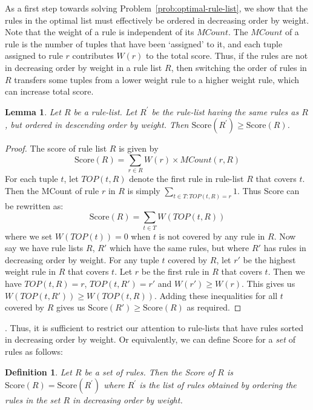 \documentclass[10pt,journal,compsoc]{IEEEtran}
\newtheorem{lemma}{Lemma}
\newtheorem{definition}{Definition}
\newcounter{prob}
\newcommand{\papertext}[1]{}
\newcommand{\techreporttext}[1]{#1}
\begin{document}
As a first step towards solving Problem~\ref{prob:optimal-rule-list}, we show that the rules in the optimal list must effectively be ordered in decreasing order by weight. Note that the weight of a rule is independent of its $MCount$. The $MCount$ of a rule is the number of tuples that have been `assigned' to it, and each tuple assigned to rule $r$ contributes $W(r)$ to the total score. Thus, if the rules are not in decreasing order by weight in a rule list $R$, then switching the order of rules in $R$ transfers some tuples from a lower weight rule to a higher weight rule, which can increase total score.

\begin{lemma}\label{lemma:rule-ordering}
Let $R$ be a rule-list. Let $R^{\prime}$ be the rule-list having the same rules as $R$, but ordered in descending order by weight. Then
$\text{Score}(R^{\prime}) \geq \text{Score}(R)$.
\end{lemma}
\papertext{The proof of this lemma, as well as other proofs, can be found in the technical report~\cite{tr}}\techreporttext{
\begin{proof}
The score of rule list $R$ is given by $$\text{Score}(R) = \sum_{r \in R} W(r) \times MCount(r,R)$$
For each tuple $t$, let $TOP(t,R)$ denote the first rule in rule-list $R$ that covers $t$. Then the MCount of rule $r$ in $R$ is simply $\sum_{t \in T : TOP(t,R) = r} 1$. Thus Score can be rewritten as:
$$\text{Score}(R) = \sum_{t \in T} W(TOP(t,R))$$
where we set $W(TOP(t)) = 0$ when $t$ is not covered by any rule in $R$. Now say we have rule lists $R$, $R'$ which have the same rules, but where $R'$ has rules in decreasing order by weight. For any tuple $t$ covered by $R$, let $r'$ be the highest weight rule in $R$ that covers $t$. Let $r$ be the first rule in $R$ that covers $t$. Then we have $TOP(t,R) = r$, $TOP(t, R') = r'$ and $W(r') \geq W(r)$. This gives us $W(TOP(t,R')) \geq W(TOP(t,R))$. Adding these inequalities for all $t$ covered by $R$ gives us $\text{Score}(R') \geq \text{Score}(R)$ as required.
\end{proof}
}. 
Thus, it is sufficient to restrict our attention to rule-lists that have rules sorted in decreasing order by weight. Or equivalently, we can define Score for a \emph{set} of rules as follows:

\begin{definition}\label{def:set-score}
Let $R$ be a set of rules. Then the Score of $R$ is
$\text{Score}(R) = \text{Score}(R^{\prime})$
where $R^{\prime}$ is the list of rules obtained by ordering the rules in the set $R$ in decreasing order by weight.
\end{definition}
\end{document}
